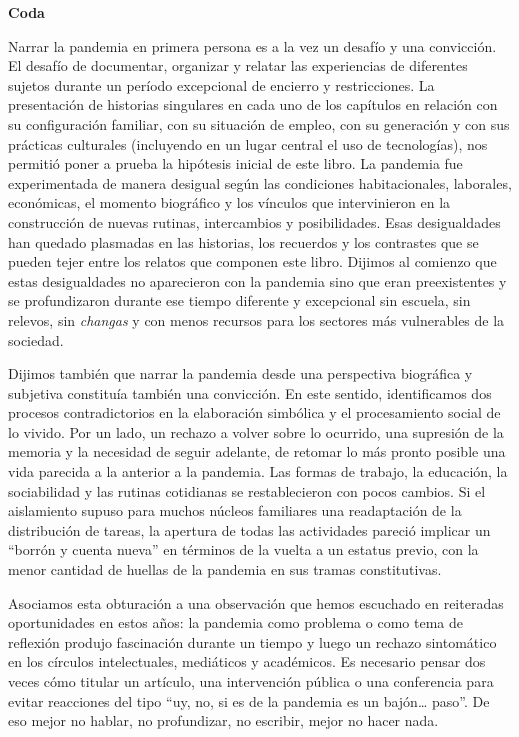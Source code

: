 \textbf{Coda}

Narrar la pandemia en primera persona es a la vez un desafío y una convicción. El desafío de documentar, organizar y relatar las experiencias de diferentes sujetos durante un período excepcional de encierro y restricciones. La presentación de historias singulares en cada uno de los capítulos en relación con su configuración familiar, con su situación de empleo, con su generación y con sus prácticas culturales (incluyendo en un lugar central el uso de tecnologías), nos permitió poner a prueba la hipótesis inicial de este libro. La pandemia fue experimentada de manera desigual según las condiciones habitacionales, laborales, económicas, el momento biográfico y los vínculos que intervinieron en la construcción de nuevas rutinas, intercambios y posibilidades. Esas desigualdades han quedado plasmadas en las historias, los recuerdos y los contrastes que se pueden tejer entre los relatos que componen este libro. Dijimos al comienzo que estas desigualdades no aparecieron con la pandemia sino que eran preexistentes y se profundizaron durante ese tiempo diferente y excepcional sin escuela, sin relevos, sin \emph{changas} y con menos recursos para los sectores más vulnerables de la sociedad.

Dijimos también que narrar la pandemia desde una perspectiva biográfica y subjetiva constituía también una convicción. En este sentido, identificamos dos procesos contradictorios en la elaboración simbólica y el procesamiento social de lo vivido. Por un lado, un rechazo a volver sobre lo ocurrido, una supresión de la memoria y la necesidad de seguir adelante, de retomar lo más pronto posible una vida parecida a la anterior a la pandemia. Las formas de trabajo, la educación, la sociabilidad y las rutinas cotidianas se restablecieron con pocos cambios. Si el aislamiento supuso para muchos núcleos familiares una readaptación de la distribución de tareas, la apertura de todas las actividades pareció implicar un ``borrón y cuenta nueva'' en términos de la vuelta a un estatus previo, con la menor cantidad de huellas de la pandemia en sus tramas constitutivas.~

Asociamos esta obturación a una observación que hemos escuchado en reiteradas oportunidades en estos años: la pandemia como problema o como tema de reflexión produjo fascinación durante un tiempo y luego un rechazo sintomático en los círculos intelectuales, mediáticos y académicos. Es necesario pensar dos veces cómo titular un artículo, una intervención pública o una conferencia para evitar reacciones del tipo ``uy, no, si es de la pandemia es un bajón\ldots{} paso''. De eso mejor no hablar, no profundizar, no escribir, mejor no hacer nada.

